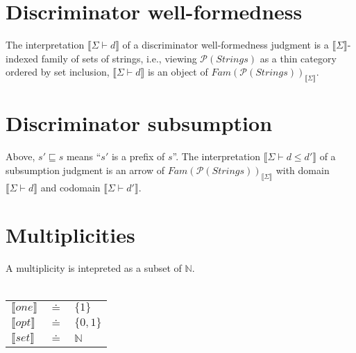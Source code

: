 \documentclass{article}
\newcommand{\sem}[1]{\llbracket #1 \rrbracket}
\begin{document}
\section*{Discriminator well-formedness}


The interpretation $\sem{\Sigma \vdash d}$ of a discriminator well-formedness judgment is a $\sem{\Sigma}$-indexed family of sets of strings, i.e., viewing $\mathcal P(\mathit{Strings})$ as a thin category ordered by set inclusion, $\sem{\Sigma \vdash d}$ is an object of $\mathit{Fam}(\mathcal P(\mathit{Strings}))_{\sem{\Sigma}}$. 

\section*{Discriminator subsumption}


Above, $s' \sqsubseteq s$ means ``$s'$ is a prefix of $s$''. 
The interpretation $\sem{\Sigma \vdash d \leq d'}$ of a subsumption judgment is an arrow of $\mathit{Fam}(\mathcal P(\mathit{Strings}))_{\sem{\Sigma}}$ with domain $\sem{\Sigma \vdash d}$ and codomain $\sem{\Sigma \vdash d'}$.

\section*{Multiplicities}

A multiplicity is intepreted as a subset of $\mathbb N$.\\~\\
\begin{tabular}{lll}
$\sem{one}$ & $\doteq$ & $\{ 1 \}$ \\
$\sem{opt}$ & $\doteq$ & $\{ 0, 1 \}$ \\
$\sem{set}$ & $\doteq$ & $\mathbb N$
\end{tabular}
\end{document}

